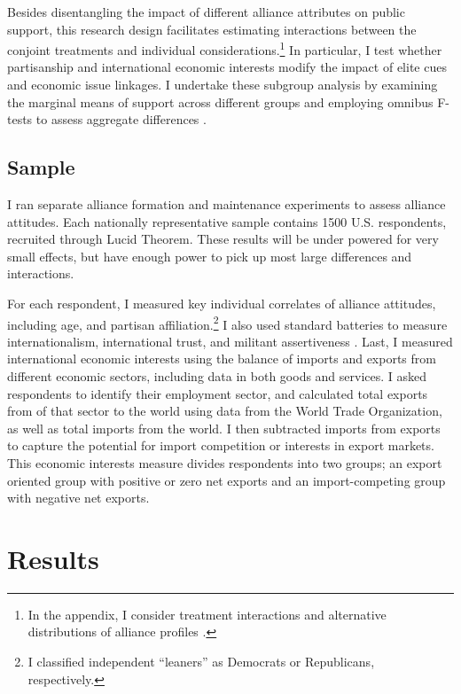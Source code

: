 \documentclass[12pt]{article}
\begin{document}
Besides disentangling the impact of different alliance attributes on public support, this research design facilitates estimating interactions between the conjoint treatments and individual considerations.\footnote{In the appendix, I consider treatment interactions and alternative distributions of alliance profiles \citep{delaCuestaetal2021}.}
In particular, I test whether partisanship and international economic interests modify the impact of elite cues and economic issue linkages. 
I undertake these subgroup analysis by examining the marginal means of support across different groups and employing omnibus F-tests to assess aggregate differences \citep{Leeperetal2020}. 



\subsection{Sample}


I ran separate alliance formation and maintenance experiments to assess alliance attitudes. 
Each nationally representative sample contains 1500 U.S. respondents, recruited through Lucid Theorem.
These results will be under powered for very small effects, but have enough power to pick up most large differences and interactions. 


For each respondent, I measured key individual correlates of alliance attitudes, including age, and partisan affiliation.\footnote{I classified independent ``leaners'' as Democrats or Republicans, respectively.}
I also used standard batteries to measure internationalism, international trust, and militant assertiveness \citep{Herrmannetal1999, KertzerBrutger2016}.
Last, I measured international economic interests using the balance of imports and exports from different economic sectors, including data in both goods and services. 
I asked respondents to identify their employment sector, and calculated total exports from of that sector to the world using data from the World Trade Organization, as well as total imports from the world. 
I then subtracted imports from exports to capture the potential for import competition or interests in export markets.
This economic interests measure divides respondents into two groups; an export oriented group with positive or zero net exports and an import-competing group with negative net exports. 


\section{Results} 
\end{document}
